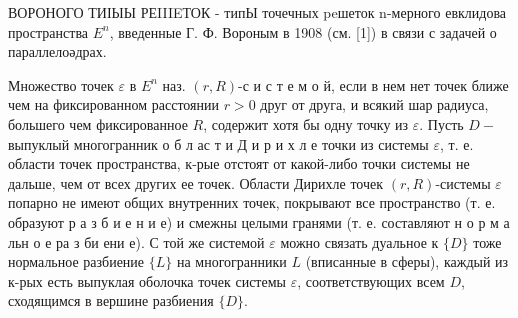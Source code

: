 \documentclass[10pt]{article}
\begin{document}
ВОРОНОГО ТИІЫЫ РЕIIIEТОК - типЫ точечных peшеток n-мерного евклидова пространства $E^{n}$, введенные Г. Ф. Вороным в 1908 (см. [1]) в связи с задачей о параллелоәдрах.



Множество точек $\varepsilon$ в $E^{n}$ наз. $(r, R)$-с и с т е м о й, если в нем нет точек ближе чем на фиксированном расстоянии $r>0$ друг от друга, и всякий шар радиуса, большего чем фиксированное $R$, содержит хотя бы одну точку из $\varepsilon$. Пусть $D-$ выпуклый многогранник о б л ас т и Д и р и х л е точки из системы $\varepsilon$, т. е. области точек пространства, к-рые отстоят от какой-либо точки системы не дальше, чем от всех других ее точек. Области Дирихле точек $(r, R)$-системы $\varepsilon$ попарно не имеют общих внутренних точек, покрывают все пространство (т. е. образуют р а з б и е н и е) и смежны целыми гранями (т. е. составляют н о р м а льн о е ра з би ени е). С той же системой $\varepsilon$ можно связать дуальное к $\{D\}$ тоже нормальное разбиение $\{L\}$ на многогранники $L$ (вписанные в сферы), каждый из к-рых есть выпуклая оболочка точек системы $\varepsilon$, соответствующих всем $D$, сходящимся в вершине разбиения $\{D\}$.
\end{document}
